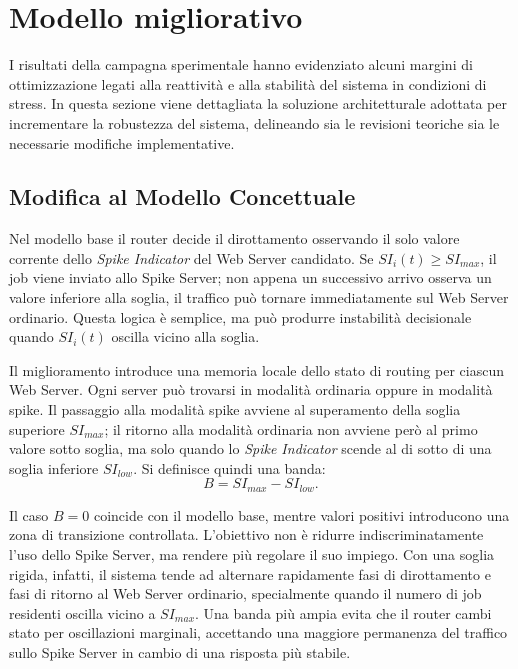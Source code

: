 ﻿\documentclass[a4paper,12pt]{article}
\begin{document}
\section{Modello migliorativo}
I risultati della campagna sperimentale hanno evidenziato alcuni margini di ottimizzazione legati alla reattività e alla stabilità del sistema in condizioni di stress. In questa sezione viene dettagliata la soluzione architetturale adottata per incrementare la robustezza del sistema, delineando sia le revisioni teoriche sia le necessarie modifiche implementative.


\subsection{Modifica al Modello Concettuale}
Nel modello base il router decide il dirottamento osservando il solo valore corrente dello \textit{Spike Indicator} del Web Server candidato. Se $SI_i(t)\ge SI_{max}$, il job viene inviato allo Spike Server; non appena un successivo arrivo osserva un valore inferiore alla soglia, il traffico può tornare immediatamente sul Web Server ordinario. Questa logica è semplice, ma può produrre instabilità decisionale quando $SI_i(t)$ oscilla vicino alla soglia.

Il miglioramento introduce una memoria locale dello stato di routing per ciascun Web Server. Ogni server può trovarsi in modalità ordinaria oppure in modalità spike. Il passaggio alla modalità spike avviene al superamento della soglia superiore $SI_{max}$; il ritorno alla modalità ordinaria non avviene però al primo valore sotto soglia, ma solo quando lo \textit{Spike Indicator} scende al di sotto di una soglia inferiore $SI_{low}$. Si definisce quindi una banda:
\begin{equation}
    B = SI_{max} - SI_{low}.
\end{equation}

Il caso $B=0$ coincide con il modello base, mentre valori positivi introducono una zona di transizione controllata. L'obiettivo non è ridurre indiscriminatamente l'uso dello Spike Server, ma rendere più regolare il suo impiego. Con una soglia rigida, infatti, il sistema tende ad alternare rapidamente fasi di dirottamento e fasi di ritorno al Web Server ordinario, specialmente quando il numero di job residenti oscilla vicino a $SI_{max}$. Una banda più ampia evita che il router cambi stato per oscillazioni marginali, accettando una maggiore permanenza del traffico sullo Spike Server in cambio di una risposta più stabile.
\end{document}
